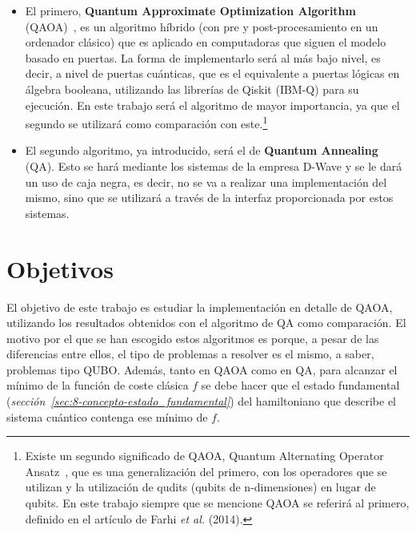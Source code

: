 \begin{itemize}
\item El primero, \textbf{Quantum Approximate Optimization Algorithm} (QAOA)~\cite{qaoa_paper_original}, es un algoritmo híbrido (con pre y post-procesamiento en un ordenador clásico) que es aplicado en computadoras que siguen el modelo basado en puertas.
  La forma de implementarlo será al más bajo nivel, es decir, a nivel de puertas cuánticas, que es el equivalente a puertas lógicas en álgebra booleana, utilizando las librerías de Qiskit (IBM-Q) para su ejecución.
  En este trabajo será el algoritmo de mayor importancia, ya que el segundo se utilizará como comparación con este.\footnote{
    Existe un segundo significado de QAOA, Quantum Alternating Operator Ansatz~\cite{quantum_alternating_operator_ansatz}, que es una generalización del primero, con los operadores que se utilizan y la utilización de qudits (qubits de n-dimensiones) en lugar de qubits.
    En este trabajo siempre que se mencione QAOA se referirá al primero, definido en el artículo de Farhi \textit{et al.} (2014)\cite{qaoa_paper_original}.
  }

\item El segundo algoritmo, ya introducido, será el de \textbf{Quantum Annealing} (QA).
  Esto se hará mediante los sistemas de la empresa D-Wave y se le dará un uso de caja negra, es decir, no se va a realizar una implementación del mismo, sino que se utilizará a través de la interfaz proporcionada por estos sistemas.
\end{itemize}

\section{Objetivos}

El objetivo de este trabajo es estudiar la implementación en detalle de QAOA, utilizando los resultados obtenidos con el algoritmo de QA como comparación.
El motivo por el que se han escogido estos algoritmos es porque, a pesar de las diferencias entre ellos, el tipo de problemas a resolver es el mismo, a saber, problemas tipo QUBO\@.
Además, tanto en QAOA como en QA, para alcanzar el mínimo de la función de coste clásica $f$ se debe hacer que el estado fundamental (\textit{sección~\ref{sec:8-concepto-estado_fundamental}}) del hamiltoniano que describe el sistema cuántico contenga ese mínimo de $f$.



